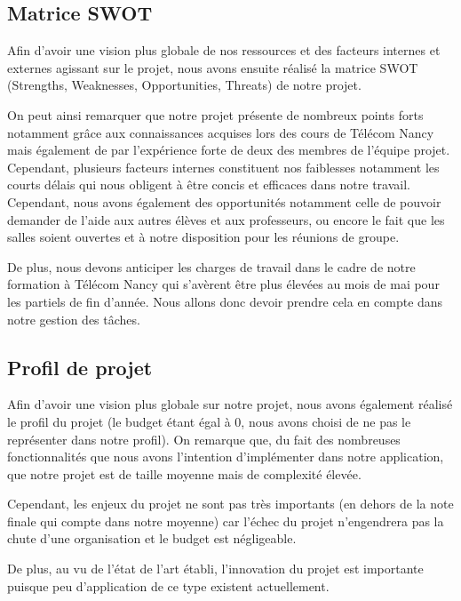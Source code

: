 \documentclass[french,a4paper]{article}
\begin{document}
    \subsection{Matrice SWOT}
    Afin d’avoir une vision plus globale de nos ressources et des facteurs internes et externes agissant sur le projet, nous avons ensuite réalisé la matrice SWOT (Strengths, Weaknesses, Opportunities, Threats) de notre projet.


    On peut ainsi remarquer que notre projet présente de nombreux points forts notamment grâce aux connaissances acquises lors des cours de Télécom Nancy
    mais également de par l’expérience forte de deux des membres de l’équipe projet.  Cependant, plusieurs facteurs internes constituent nos faiblesses
    notamment les courts délais qui nous obligent à être concis et efficaces dans notre travail. Cependant, nous avons également des opportunités notamment
    celle de pouvoir demander de l'aide aux autres élèves et aux professeurs, ou encore le fait que les salles soient ouvertes et à notre disposition pour
    les réunions de groupe.

    De plus, nous devons anticiper les charges de travail dans le cadre de notre formation à Télécom Nancy qui s'avèrent être plus élevées au mois de mai
    pour les partiels de fin d'année. Nous allons donc devoir prendre cela en compte dans notre gestion des tâches.

    \subsection{Profil de projet}

    Afin d’avoir une vision plus globale sur notre projet, nous avons également réalisé le profil du projet (le budget étant égal à 0, nous avons choisi de ne pas le représenter dans notre profil). On remarque que, du fait des nombreuses fonctionnalités que nous avons l’intention d’implémenter dans notre application, que notre projet est de taille moyenne mais de complexité élevée.

    Cependant, les enjeux du projet ne sont pas très importants (en dehors de la note finale qui compte dans notre moyenne) car l'échec du projet n'engendrera pas la chute d'une organisation et le budget est négligeable.

    De plus, au vu de l’état de l’art établi, l’innovation du projet est importante puisque peu d'application de ce type existent actuellement.
\end{document}
